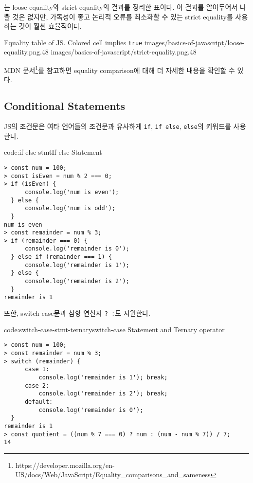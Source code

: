 는 loose equality와 strict equality의 결과를 정리한 표이다. 이 결과를 알아두어서 나쁠 것은 없지만, 가독성이 좋고 논리적 오류를 최소화할 수 있는 strict equality를 사용하는 것이 훨씬 효율적이다.

    {Equality table of JS. Colored cell implies \texttt{true}\protect\footnotemark}{
        {images/basics-of-javascript/loose-equality.png}{.48}
        {images/basics-of-javascript/strict-equality.png}{.48}
}


MDN 문서\footnote{https://developer.mozilla.org/en-US/docs/Web/JavaScript/Equality\_comparisons\_and\_sameness}를 참고하면 equality comparison에 대해 더 자세한 내용을 확인할 수 있다.

\subsection*{Conditional Statements}

JS의 조건문은 여타 언어들의 조건문과 유사하게 \texttt{if}, \texttt{if else}, \texttt{else}의 키워드를 사용한다.

\begin{codeenv}{code:if-else-stmt}{If-else Statement}\begin{verbatim}
> const num = 100;
> const isEven = num % 2 === 0;
> if (isEven) {
      console.log('num is even');
  } else {
      console.log('num is odd');
  }
num is even
> const remainder = num % 3;
> if (remainder === 0) {
      console.log('remainder is 0');
  } else if (remainder === 1) {
      console.log('remainder is 1');
  } else {
      console.log('remainder is 2');
  }
remainder is 1
\end{verbatim}
\end{codeenv}
\newpage

또한, switch-case문과 삼항 연산자 \texttt{? :}도 지원한다.

\begin{codeenv}{code:switch-case-stmt-ternary}{switch-case Statement and Ternary operator}\begin{verbatim}
> const num = 100;
> const remainder = num % 3;
> switch (remainder) {
      case 1:
          console.log('remainder is 1'); break;
      case 2:
          console.log('remainder is 2'); break;
      default:
          console.log('remainder is 0');
  }
remainder is 1
> const quotient = ((num % 7 === 0) ? num : (num - num % 7)) / 7;
14
\end{verbatim}
\end{codeenv}

